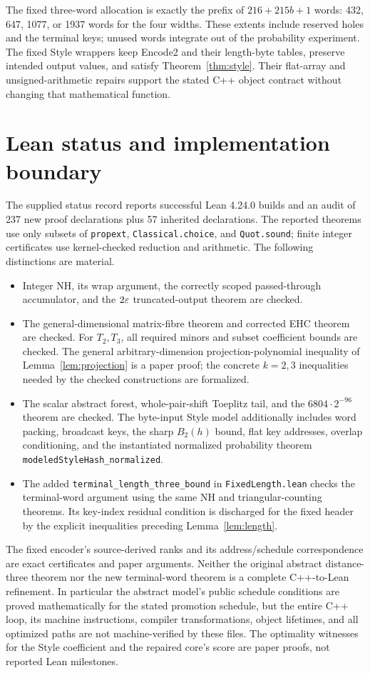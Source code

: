 The fixed three-word allocation is exactly the prefix of $216+215b+1$ words: 432, 647, 1077, or 1937 words for the four widths. These extents include reserved holes and the terminal keys; unused words integrate out of the probability experiment. The fixed Style wrappers keep Encode2 and their length-byte tables, preserve intended output values, and satisfy Theorem~\ref{thm:style}. Their flat-array and unsigned-arithmetic repairs support the stated C++ object contract without changing that mathematical function.

\section{Lean status and implementation boundary}\label{sec:lean}
The supplied status record\cite{lean} reports successful Lean 4.24.0 builds and an audit of 237 new proof declarations plus 57 inherited declarations. The reported theorems use only subsets of \texttt{propext}, \texttt{Classical.choice}, and \texttt{Quot.sound}; finite integer certificates use kernel-checked reduction and arithmetic. The following distinctions are material.
\begin{itemize}
\item Integer NH, its wrap argument, the correctly scoped passed-through accumulator, and the $2\varepsilon$ truncated-output theorem are checked.
\item The general-dimensional matrix-fibre theorem and corrected EHC theorem are checked. For $T_2,T_3$, all required minors and subset coefficient bounds are checked. The general arbitrary-dimension projection-polynomial inequality of Lemma~\ref{lem:projection} is a paper proof; the concrete $k=2,3$ inequalities needed by the checked constructions are formalized.
\item The scalar abstract forest, whole-pair-shift Toeplitz tail, and the $6804\cdot2^{-96}$ theorem are checked. The byte-input Style model additionally includes word packing, broadcast keys, the sharp $B_2(h)$ bound, flat key addresses, overlap conditioning, and the instantiated normalized probability theorem \texttt{modeledStyleHash\_normalized}.
\item The added \texttt{terminal\_length\_three\_bound} in \texttt{FixedLength.lean} checks the terminal-word argument using the same NH and triangular-counting theorems. Its key-index residual condition is discharged for the fixed header by the explicit inequalities preceding Lemma~\ref{lem:length}.
\end{itemize}
The fixed encoder's source-derived ranks and its address/schedule correspondence are exact certificates and paper arguments. Neither the original abstract distance-three theorem nor the new terminal-word theorem is a complete C++-to-Lean refinement. In particular the abstract model's public schedule conditions are proved mathematically for the stated promotion schedule, but the entire C++ loop, its machine instructions, compiler transformations, object lifetimes, and all optimized paths are not machine-verified by these files. The optimality witnesses for the Style coefficient and the repaired core's score are paper proofs, not reported Lean milestones.

